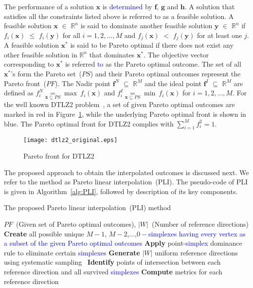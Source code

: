 The performance of a solution $\textbf{x}$ is \textcolor{blue}{determined} by $\textbf{f}$, $\textbf{g}$ and $\textbf{h}$. A solution that satisfies all the constraints listed above is referred to as a feasible solution. A feasible solution $\textbf{x}$ $\in$ $\mathbb{R}^n$ is said to dominate another feasible solution $\textbf{y}$ $\in$ $\mathbb{R}^n$ if $f_{i}{(\textbf{x})}$ $\leq$ $f_{i}{(\textbf{y})}$ for all $i=1,2,\dots,M$ and $f_{j}{(\textbf{x})}$ $<$ $f_{j}{(\textbf{y})}$ for at least one $j$. A feasible solution $\textbf{x}^{*}$ is said to be Pareto optimal if there does not exist any other feasible solution in $\mathbb{R}^n$ that dominates $\textbf{x}^{*}$. The objective vector corresponding to $\textbf{x}^{*}$ is referred \textcolor{blue}{to} as the Pareto optimal outcome. The set of all $\textbf{x}^{*}$'s form the Pareto set~($PS$) and their Pareto optimal outcomes represent the Pareto front~($PF$). The Nadir point $\textbf{f}^{N}$ $\subseteq$ $\mathbb{R}^M$ and the ideal point $\textbf{f}^{I}$ $\subseteq$ $\mathbb{R}^M$ are defined as $f_{i}^{N} \underset{\textbf{x}\subseteq PS}= \operatorname{max}~f_i(\textbf{x})$ and $f_{i}^{I} \underset{\textbf{x}\subseteq PS}= \operatorname{min}~f_i(\textbf{x})$ for $i=1,2,\dots,M$. For the well known DTLZ2 problem~\cite{deb2002scalable}, a set of given Pareto optimal outcomes are marked in red in Figure~\ref{fig:dtlz2_original}, while the underlying Pareto optimal front is shown in blue. The Pareto optimal front for DTLZ2 complies with $\sum^{M}_{i=1}{f^2_i}=1$.

\begin{figure}[!ht]
	\centering
	\texttt{[image: dtlz2\_original.eps]}
	\caption{Pareto front for DTLZ2}
	\label{fig:dtlz2_original}
\end{figure}

The proposed approach to obtain the interpolated outcomes is discussed next. We refer to the method as Pareto linear interpolation~(PLI). The pseudo-code of PLI is given in Algorithm~\ref{alg:PLI}, followed by description of its key components. 

\begin{algorithm}[!ht]\footnotesize
	\caption{The proposed Pareto linear interpolation~(PLI) method}
	\begin{algorithmic}[1]
		\REQUIRE $PF$~(Given set of Pareto optimal outcomes), $|W|$~(Number of reference directions) \\	 
		\STATE \textbf{Create} all possible unique $M-1$, $M-2$,$\ldots$,$0-$\textcolor{blue}{simplexes having every vertex as a subset of the given Pareto optimal outcomes}
		\STATE \textbf{Apply} point-\textcolor{blue}{simplex} dominance rule to eliminate certain \textcolor{blue}{simplexes}
		\STATE \textbf{Generate} $|W|$ uniform reference directions using systematic sampling~\cite{DASAugust1998}
		\STATE \textbf{Identify} points of intersection between each reference direction and all survived \textcolor{blue}{simplexes} 
		\STATE \textbf{Compute} metrics for each reference direction 
	\end{algorithmic}
	\label{alg:PLI}
\end{algorithm}

